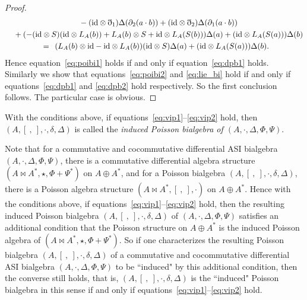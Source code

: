 \documentclass[pdftex]{sigma}
\numberwithin{equation}{section}
\newcommand{\id}{\mathrm{id}}
\begin{document}
\begin{proof}
\begin{gather*}
 \quad {}- (\id \otimes \eth_1)\Delta(\partial_2(a \cdot b)) + (\id \otimes \eth_2)\Delta(\partial_1(a \cdot b)) \\
 \quad {}+ ( - (\id \otimes S)(\id \otimes L_A(b)) + L_A(b) \otimes S + \id \otimes L_A(S(b)) ) \Delta(a) + ( \id \otimes L_A(S(a)) ) \Delta(b) \\
 \overset{\hphantom{(3.2)}}{=} (L_A(b) \otimes \id - \id \otimes L_A(b))(\id \otimes S) \Delta(a) + ( \id \otimes L_A(S(a)) ) \Delta(b).
	\end{gather*}
 Hence equation~\eqref{eq:poibi1} holds if and only if equation~\eqref{eq:dpb1} holds.
 Similarly we show that equations~\eqref{eq:poibi2} and \eqref{eq:lie_bi} hold if and only if equations~\eqref{eq:dpb1} and \eqref{eq:dpb2} hold respectively.
 So the first conclusion follows. The particular case is obvious.
\end{proof}

With the conditions above, if equations~\eqref{eq:vip1}--\eqref{eq:vip2} hold, then $(A, [\ ,\ ], \cdot, \delta, \Delta)$ is called the \textit{induced Poisson bialgebra of $(A, \cdot, \Delta, \Phi, \Psi)$}.

\begin{Remark}\label{rmk:iff}
 Note that for a commutative and cocommutative differential ASI bialgebra $(A, \cdot, \Delta, \Phi, \Psi)$,
 there is a commutative differential algebra structure $(A \bowtie A^*, \star, \Phi + \Psi^*)$ on $A \oplus A^*$,
 and for a Poisson bialgebra $(A, [\ ,\ ], \cdot, \delta, \Delta)$,
 there is a Poisson algebra structure $(A \bowtie A^*, [\ ,\ ], \cdot)$ on $A \oplus A^*$.
 Hence with the conditions above, if equations~\eqref{eq:vip1}--\eqref{eq:vip2} hold,
 then the resulting induced Poisson bialgebra $(A, [\ ,\ ], \cdot, \delta, \Delta)$ of $(A, \cdot, \Delta, \Phi, \Psi)$ satisfies an additional condition that the Poisson structure on $A \oplus A^*$ is the induced Poisson algebra of $(A \bowtie A^*, \star,\allowbreak \Phi + \Psi^*)$.
 So if one characterizes the resulting Poisson bialgebra $(A, [\ ,\ ], \cdot, \delta, \Delta)$ of a commutative and cocommutative differential ASI bialgebra $(A, \cdot, \Delta, \Phi, \Psi)$ to be ``induced" by this additional condition,
 then the converse still holds, that is,
 $(A, [\ ,\ ], \cdot, \delta, \Delta)$ is the ``induced" Poisson bialgebra in this sense if and only if equations~\eqref{eq:vip1}--\eqref{eq:vip2} hold.
\end{Remark}
\end{document}
